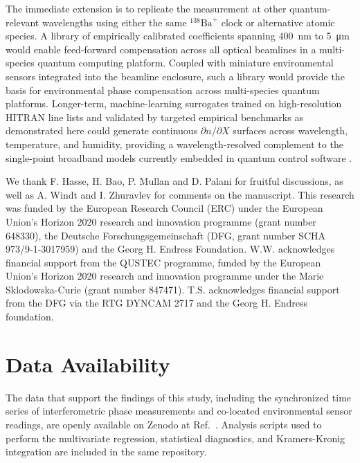 \documentclass[aps,prapplied,reprint,groupedaddress,twocolumn,superscriptaddress,linenumbers]{revtex4-2}
\begin{document}
The immediate extension is to replicate the measurement at other quantum-relevant wavelengths using either the same $^{138}\mathrm{Ba}^+$ clock or alternative atomic species. A library of empirically calibrated coefficients spanning \SI{400}{\nano\meter} to \SI{5}{\micro\meter} would enable feed-forward compensation across all optical beamlines in a multi-species quantum computing platform. Coupled with miniature environmental sensors integrated into the beamline enclosure, such a library would provide the basis for environmental phase compensation across multi-species quantum platforms. Longer-term, machine-learning surrogates trained on high-resolution HITRAN line lists \cite{gordon2022hitran2020} and validated by targeted empirical benchmarks as demonstrated here could generate continuous $\partial n/\partial X$ surfaces across wavelength, temperature, and humidity, providing a wavelength-resolved complement to the single-point broadband models currently embedded in quantum control software \cite{ukkonen2022improving}.

\begin{acknowledgments}
We thank F. Hasse, H. Bao, P. Mullan and D. Palani for fruitful discussions, as well as A. Windt and I. Zhuravlev for comments on the manuscript. This research was funded by the European Research Council (ERC) under the European Union's Horizon 2020 research and innovation programme (grant number 648330), the Deutsche Forschungsgemeinschaft (DFG, grant number SCHA 973/9-1-3017959) and the Georg H. Endress Foundation. W.W. acknowledges financial support from the QUSTEC programme, funded by the European Union's Horizon 2020 research and innovation programme under the Marie Sklodowska-Curie (grant number 847471). T.S. acknowledges financial support from the DFG via the RTG DYNCAM 2717 and the Georg H. Endress foundation.
\end{acknowledgments}

\section*{Data Availability}
The data that support the findings of this study, including the synchronized time series of interferometric phase measurements and co-located environmental sensor readings, are openly available on Zenodo at Ref.~\cite{wu_2026_18800166}. Analysis scripts used to perform the multivariate regression, statistical diagnostics, and Kramers-Kronig integration are included in the same repository.


\end{document}
